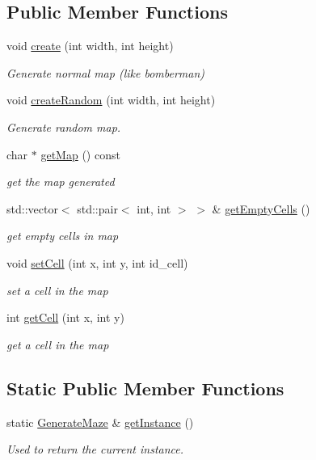\subsection*{Public Member Functions}
\begin{DoxyCompactItemize}
\item 
void \hyperlink{class_generate_maze_a4e31a3b0529f072fc09a779410303d11}{create} (int width, int height)
\begin{DoxyCompactList}\small\item\em Generate normal map (like bomberman) \end{DoxyCompactList}\item 
void \hyperlink{class_generate_maze_abdbe8f10919c803ae559c13b449290ee}{create\+Random} (int width, int height)
\begin{DoxyCompactList}\small\item\em Generate random map. \end{DoxyCompactList}\item 
char $\ast$ \hyperlink{class_generate_maze_a2d6a889698a8b71473935c7b31b7f31e}{get\+Map} () const 
\begin{DoxyCompactList}\small\item\em get the map generated \end{DoxyCompactList}\item 
std\+::vector$<$ std\+::pair$<$ int, int $>$ $>$ \& \hyperlink{class_generate_maze_ada26aa042e28e5079c4a49365a1ea4f1}{get\+Empty\+Cells} ()
\begin{DoxyCompactList}\small\item\em get empty cells in map \end{DoxyCompactList}\item 
void \hyperlink{class_generate_maze_abf66b22d2f1d741304f4aab7929f1d53}{set\+Cell} (int x, int y, int id\+\_\+cell)
\begin{DoxyCompactList}\small\item\em set a cell in the map \end{DoxyCompactList}\item 
int \hyperlink{class_generate_maze_a71c4607fe4a0086f259ef32b2400ac87}{get\+Cell} (int x, int y)
\begin{DoxyCompactList}\small\item\em get a cell in the map \end{DoxyCompactList}\end{DoxyCompactItemize}
\subsection*{Static Public Member Functions}
\begin{DoxyCompactItemize}
\item 
static \hyperlink{class_generate_maze}{Generate\+Maze} \& \hyperlink{class_generate_maze_a27d12dc6eb88baa39e7b08c6057fc67c}{get\+Instance} ()
\begin{DoxyCompactList}\small\item\em Used to return the current instance. \end{DoxyCompactList}\end{DoxyCompactItemize}
